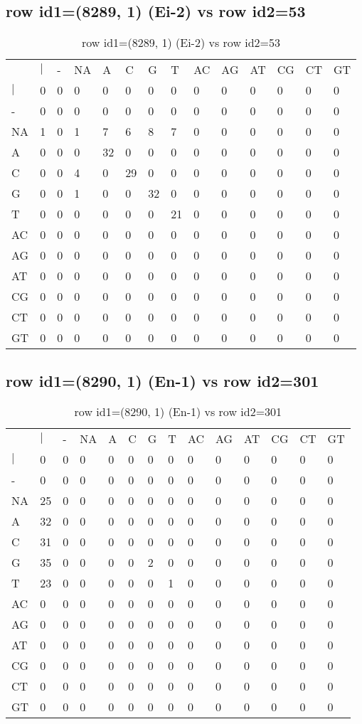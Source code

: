 \subsection{row id1=(8289, 1) (Ei-2) vs row id2=53}
\begin{center}
\begin{longtable}{|l|l|l|l|l|l|l|l|l|l|l|l|l|l|}
\caption{row id1=(8289, 1) (Ei-2) vs row id2=53} \label{table_dm456}\\
\hline
\\
\hline
&$|$&-&NA&A&C&G&T&AC&AG&AT&CG&CT&GT\\
$|$&0&0&0&0&0&0&0&0&0&0&0&0&0\\
-&0&0&0&0&0&0&0&0&0&0&0&0&0\\
NA&1&0&1&7&6&8&7&0&0&0&0&0&0\\
A&0&0&0&32&0&0&0&0&0&0&0&0&0\\
C&0&0&4&0&29&0&0&0&0&0&0&0&0\\
G&0&0&1&0&0&32&0&0&0&0&0&0&0\\
T&0&0&0&0&0&0&21&0&0&0&0&0&0\\
AC&0&0&0&0&0&0&0&0&0&0&0&0&0\\
AG&0&0&0&0&0&0&0&0&0&0&0&0&0\\
AT&0&0&0&0&0&0&0&0&0&0&0&0&0\\
CG&0&0&0&0&0&0&0&0&0&0&0&0&0\\
CT&0&0&0&0&0&0&0&0&0&0&0&0&0\\
GT&0&0&0&0&0&0&0&0&0&0&0&0&0\\
\hline
\end{longtable}
\end{center}

\subsection{row id1=(8290, 1) (En-1) vs row id2=301}
\begin{center}
\begin{longtable}{|l|l|l|l|l|l|l|l|l|l|l|l|l|l|}
\caption{row id1=(8290, 1) (En-1) vs row id2=301} \label{table_dm458}\\
\hline
\\
\hline
&$|$&-&NA&A&C&G&T&AC&AG&AT&CG&CT&GT\\
$|$&0&0&0&0&0&0&0&0&0&0&0&0&0\\
-&0&0&0&0&0&0&0&0&0&0&0&0&0\\
NA&25&0&0&0&0&0&0&0&0&0&0&0&0\\
A&32&0&0&0&0&0&0&0&0&0&0&0&0\\
C&31&0&0&0&0&0&0&0&0&0&0&0&0\\
G&35&0&0&0&0&2&0&0&0&0&0&0&0\\
T&23&0&0&0&0&0&1&0&0&0&0&0&0\\
AC&0&0&0&0&0&0&0&0&0&0&0&0&0\\
AG&0&0&0&0&0&0&0&0&0&0&0&0&0\\
AT&0&0&0&0&0&0&0&0&0&0&0&0&0\\
CG&0&0&0&0&0&0&0&0&0&0&0&0&0\\
CT&0&0&0&0&0&0&0&0&0&0&0&0&0\\
GT&0&0&0&0&0&0&0&0&0&0&0&0&0\\
\hline
\end{longtable}
\end{center}

